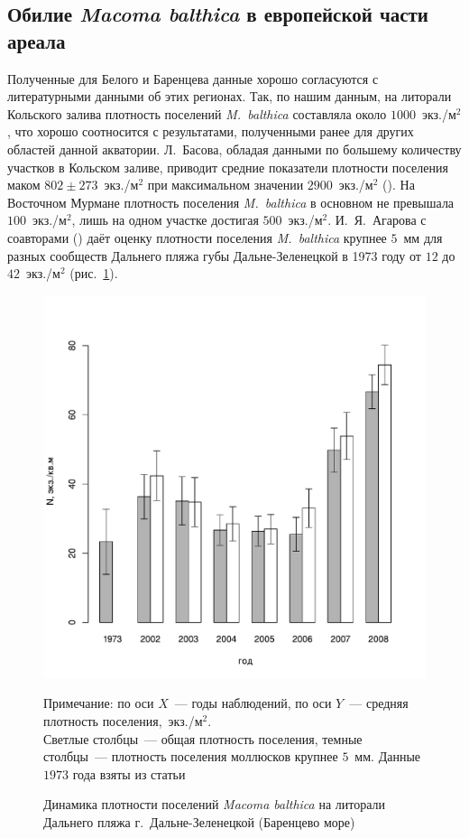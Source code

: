 		\subsection{Обилие {\it Macoma balthica} в европейской части ареала}
Полученные для Белого и Баренцева данные хорошо согласуются с литературными данными об этих регионах.
Так, по нашим данным, на литорали Кольского залива плотность поселений {\it M.~balthica} составляла около $1000$~экз./м$^2$, что хорошо соотносится с результатами, полученными ранее для других областей данной акватории. 
Л.~Басова, обладая данными по большему количеству участков в Кольском заливе, приводит средние показатели плотности поселения маком $802 \pm 273$~экз./м$^2$ при максимальном значении $2900$~экз./м$^2$ (\cite{Basova_2004}).
На Восточном Мурмане плотность поселения {\it M.~balthica} в основном не превышала $100$~экз./м$^2$, лишь на одном участке достигая $500$~экз./м$^2$. 
И.~Я.~Агарова с соавторами (\cite{Agarova_et_al_1976}) даёт оценку плотности поселения {\it M.~balthica} крупнее $5$~мм для разных сообществ Дальнего пляжа губы Дальне-Зеленецкой в 1973 году от $12$ до $42$~экз./м$^2$ (рис.~\ref{ris:dynamic_Zelency_Agarova}). 
	\begin{figure}[p]
		\includegraphics{../after_Deryuginskie/Macoma_N_dynamic_all1.pdf}
	\caption{Динамика плотности поселений {\it Macoma balthica} на литорали Дальнего пляжа г.~Дальне-Зеленецкой (Баренцево море)}
{\footnotesize Примечание: по оси $X$~--- годы наблюдений, по оси $Y$~--- средняя плотность поселения,~экз./м$^2$. \\
Светлые столбцы~--- общая плотность поселения, темные столбцы~--- плотность поселения моллюсков крупнее $5$~мм. Данные $1973$ года взяты из статьи \cite{Agarova_et_al_1976}}
	\label{ris:dynamic_Zelency_Agarova}
	\end{figure}
